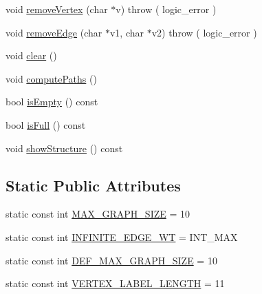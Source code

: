 \begin{DoxyCompactItemize}
\item 
void \hyperlink{class_weighted_graph_a0eb59d893befdedcda67add1466b9fdd}{remove\-Vertex} (char $\ast$v)  throw ( logic\-\_\-error )
\item 
void \hyperlink{class_weighted_graph_ad06596ac31405f02f39e482860ebe3a8}{remove\-Edge} (char $\ast$v1, char $\ast$v2)  throw ( logic\-\_\-error )
\item 
void \hyperlink{class_weighted_graph_a26890ebf74d23821a6e4dbcf803b5002}{clear} ()
\item 
void \hyperlink{class_weighted_graph_aeaea1bd5b1e14b69f2155613bfd25d68}{compute\-Paths} ()
\item 
bool \hyperlink{class_weighted_graph_a1c03a0f68447cf88fed97c2076501702}{is\-Empty} () const 
\item 
bool \hyperlink{class_weighted_graph_a22e56836e3967031a657cfa9ea5b9843}{is\-Full} () const 
\item 
void \hyperlink{class_weighted_graph_ad7f20a989073ea5401d504d944182347}{show\-Structure} () const 
\end{DoxyCompactItemize}
\subsection*{\-Static \-Public \-Attributes}
\begin{DoxyCompactItemize}
\item 
static const int \hyperlink{class_weighted_graph_af9b34017e5b494cd3aca2dbc8335fc3c}{\-M\-A\-X\-\_\-\-G\-R\-A\-P\-H\-\_\-\-S\-I\-Z\-E} = 10
\item 
static const int \hyperlink{class_weighted_graph_a5d4e3055fcccb2f50667bcd588dd8af7}{\-I\-N\-F\-I\-N\-I\-T\-E\-\_\-\-E\-D\-G\-E\-\_\-\-W\-T} = \-I\-N\-T\-\_\-\-M\-A\-X
\item 
static const int \hyperlink{class_weighted_graph_ab8b56b138f61133fe3833f96c318568e}{\-D\-E\-F\-\_\-\-M\-A\-X\-\_\-\-G\-R\-A\-P\-H\-\_\-\-S\-I\-Z\-E} = 10
\item 
static const int \hyperlink{class_weighted_graph_a19411776f4ee4e2a68bf2bc5e03aa10b}{\-V\-E\-R\-T\-E\-X\-\_\-\-L\-A\-B\-E\-L\-\_\-\-L\-E\-N\-G\-T\-H} = 11
\end{DoxyCompactItemize}
